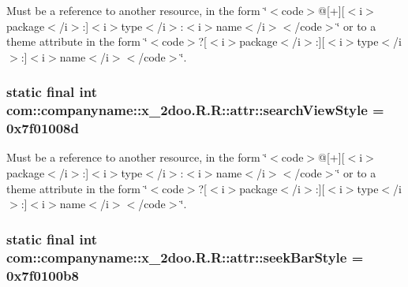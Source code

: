 Must be a reference to another resource, in the form \char`\"{}$<$code$>$@\mbox{[}+\mbox{]}\mbox{[}$<$i$>$package$<$/i$>$:\mbox{]}$<$i$>$type$<$/i$>$:$<$i$>$name$<$/i$>$$<$/code$>$\char`\"{} or to a theme attribute in the form \char`\"{}$<$code$>$?\mbox{[}$<$i$>$package$<$/i$>$:\mbox{]}\mbox{[}$<$i$>$type$<$/i$>$:\mbox{]}$<$i$>$name$<$/i$>$$<$/code$>$\char`\"{}. \hypertarget{classcom_1_1companyname_1_1x__2doo_1_1_r_1_1attr_a153e0e7d598f58190e06e96df6401e7}{
\subsubsection[{searchViewStyle}]{\setlength{\rightskip}{0pt plus 5cm}static final int com::companyname::x\_\-2doo.R.R::attr::searchViewStyle = 0x7f01008d}}
\label{classcom_1_1companyname_1_1x__2doo_1_1_r_1_1attr_a153e0e7d598f58190e06e96df6401e7}


Must be a reference to another resource, in the form \char`\"{}$<$code$>$@\mbox{[}+\mbox{]}\mbox{[}$<$i$>$package$<$/i$>$:\mbox{]}$<$i$>$type$<$/i$>$:$<$i$>$name$<$/i$>$$<$/code$>$\char`\"{} or to a theme attribute in the form \char`\"{}$<$code$>$?\mbox{[}$<$i$>$package$<$/i$>$:\mbox{]}\mbox{[}$<$i$>$type$<$/i$>$:\mbox{]}$<$i$>$name$<$/i$>$$<$/code$>$\char`\"{}. \hypertarget{classcom_1_1companyname_1_1x__2doo_1_1_r_1_1attr_390aff9fb9a7a940c92f6a1029753237}{
\subsubsection[{seekBarStyle}]{\setlength{\rightskip}{0pt plus 5cm}static final int com::companyname::x\_\-2doo.R.R::attr::seekBarStyle = 0x7f0100b8}}
\label{classcom_1_1companyname_1_1x__2doo_1_1_r_1_1attr_390aff9fb9a7a940c92f6a1029753237}


